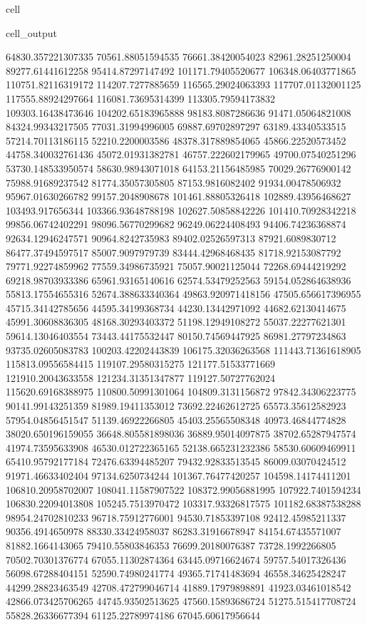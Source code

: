 \documentclass[letterpaper,10pt,english]{jupyterBook}
\begin{document}
\begin{sphinxuseclass}{cell}
\begin{sphinxVerbatimOutput}
\begin{sphinxuseclass}{cell_output}
\begin{sphinxVerbatim}[commandchars=\\\{\}]
64830.357221307335  70561.88051594535  76661.38420054023  82961.28251250004  89277.61441612258  95414.87297147492  101171.79405520677  106348.06403771865  110751.82116319172  114207.7277885659  116565.29024063393  117707.01132001125  117555.88924297664  116081.73695314399  113305.79594173832  109303.16438473646  104202.65183965888  98183.8087286636  91471.05064821008  84324.99343217505  77031.31994996005  69887.69702897297  63189.43340533515  57214.70113186115  52210.2200003586  48378.317889854065  45866.22520573452  44758.340032761436  45072.01931382781  46757.222602179965  49700.07540251296  53730.148533950574  58630.98943071018  64153.21156485985  70029.26776900142  75988.91689237542  81774.35057305805  87153.9816082402  91934.00478506932  95967.01630266782  99157.2048908678  101461.88805326418  102889.43956468627  103493.917656344  103366.93648788198  102627.50858842226  101410.70928342218  99856.06742402291  98096.56770299682  96249.06224408493  94406.74236368874  92634.12946247571  90964.8242735983  89402.02526597313  87921.6089830712  86477.37494597517  85007.9097979739  83444.42968468435  81718.92153087792  79771.92274859962  77559.34986735921  75057.90021125044  72268.69444219292  69218.98703933386  65961.93165140616  62574.53479252563  59154.052864638936  55813.17554655316  52674.388633340364  49863.920971418156  47505.656617396955  45715.34142785656  44595.34199368734  44230.13442971092  44682.62130414675  45991.30608836305  48168.30293403372  51198.12949108272  55037.22277621301  59614.13046403554  
73443.44175532447  80150.74569447925  86981.27797234863  93735.02605083783  100203.42202443839  106175.32036263568  111443.71361618905  115813.09556584415  119107.29580315275  121177.51533771669  121910.20043633558  121234.31351347877  119127.50727762024  115620.69168388975  110800.50991301064  104809.3131156872  97842.34306223775  90141.99143251359  81989.19411353012  73692.22462612725  65573.35612582923  57954.04856451547  51139.46922266805  45403.25565508348  40973.46844774828  38020.650196159055  36648.805581898036  36889.95014097875  38702.65287947574  41974.73595633908  46530.012722365165  52138.665231232386  58530.60609469911  65410.95792177184  72476.63394485207  79432.92833513545  86009.03070424512  91971.46633402404  97134.6250734244  101367.76477420257  104598.14174411201  106810.20958702007  108041.11587907522  108372.99056881995  107922.7401594234  106830.22094013808  105245.7513970472  103317.93326817575  101182.68387538288  98954.24702810233  96718.75912776001  94530.71853397108  92412.45985211337  90356.4914650978  88330.33424958037  86283.31916678947  84154.67435571007  81882.1664143065  79410.55803846353  76699.20180076387  73728.1992266805  70502.70301376774  67055.11302874364  63445.09716624674  59757.54017326436  56098.67288404151  52590.74980241774  49365.71741483694  46558.34625428247  44299.28823463549  42708.472799046714  41889.17979898891  41923.03461018542  42866.073425706265  44745.93502513625  47560.15893686724  51275.515417708724  55828.26336677394  61125.22789974186  67045.60617956644  

\end{sphinxVerbatim}
\end{sphinxuseclass}
\end{sphinxVerbatimOutput}
\end{sphinxuseclass}
\end{document}
